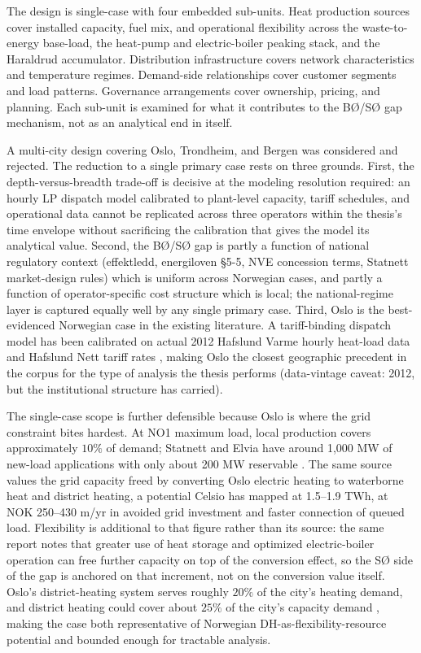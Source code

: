 The design is single-case with four embedded sub-units. Heat production sources cover installed capacity, fuel mix, and operational flexibility across the waste-to-energy base-load, the heat-pump and electric-boiler peaking stack, and the Haraldrud accumulator. Distribution infrastructure covers network characteristics and temperature regimes. Demand-side relationships cover customer segments and load patterns. Governance arrangements cover ownership, pricing, and planning. Each sub-unit is examined for what it contributes to the BØ/SØ gap mechanism, not as an analytical end in itself.

A multi-city design covering Oslo, Trondheim, and Bergen was considered and rejected. The reduction to a single primary case rests on three grounds. First, the depth-versus-breadth trade-off is decisive at the modeling resolution required: an hourly LP dispatch model calibrated to plant-level capacity, tariff schedules, and operational data cannot be replicated across three operators within the thesis's time envelope without sacrificing the calibration that gives the model its analytical value. Second, the BØ/SØ gap is partly a function of national regulatory context (effektledd, energiloven §5-5, NVE concession terms, Statnett market-design rules) which is uniform across Norwegian cases, and partly a function of operator-specific cost structure which is local; the national-regime layer is captured equally well by any single primary case. Third, Oslo is the best-evidenced Norwegian case in the existing literature. A tariff-binding dispatch model has been calibrated on actual 2012 Hafslund Varme hourly heat-load data and Hafslund Nett tariff rates \cite{kirkerud_impacts_2016}, making Oslo the closest geographic precedent in the corpus for the type of analysis the thesis performs (data-vintage caveat: 2012, but the institutional structure has carried).

The single-case scope is further defensible because Oslo is where the grid constraint bites hardest. At NO1 maximum load, local production covers approximately $10\%$ of demand; Statnett and Elvia have around 1,000 MW of new-load applications with only about 200 MW reservable \cite{Thema_fjernvarme_2024}. The same source values the grid capacity freed by converting Oslo electric heating to waterborne heat and district heating, a potential Celsio has mapped at 1.5–1.9 TWh, at NOK 250–430 m/yr in avoided grid investment and faster connection of queued load. Flexibility is additional to that figure rather than its source: the same report notes that greater use of heat storage and optimized electric-boiler operation can free further capacity on top of the conversion effect, so the SØ side of the gap is anchored on that increment, not on the conversion value itself. Oslo's district-heating system serves roughly $20\%$ of the city's heating demand, and district heating could cover about $25\%$ of the city's capacity demand \cite{energikommisjonen_mer_2023}, making the case both representative of Norwegian DH-as-flexibility-resource potential and bounded enough for tractable analysis. 

